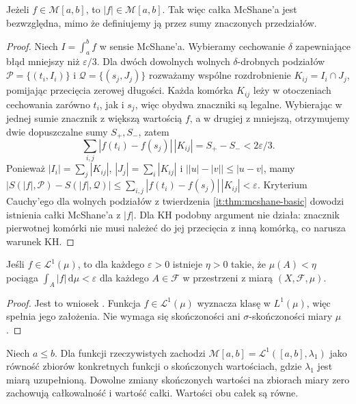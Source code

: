 \begin{twierdzenie}\label{it:thm:mcshane-absolute}
Jeżeli $f\in\mathcal M[a,b]$, to $|f|\in\mathcal M[a,b]$. Tak więc całka McShane'a jest bezwzględna, mimo że definiujemy ją przez sumy znaczonych przedziałów.
\end{twierdzenie}
\begin{proof}
Niech $I=\int_a^b f$ w sensie McShane'a. Wybieramy cechowanie $\delta$ zapewniające błąd mniejszy niż $\varepsilon/3$. Dla dwóch dowolnych wolnych $\delta$-drobnych podziałów $\mathcal P=\{(t_i,I_i)\}$ i $\mathcal Q=\{(s_j,J_j)\}$ rozważamy wspólne rozdrobnienie $K_{ij}=I_i\cap J_j$, pomijając przecięcia zerowej długości. Każda komórka $K_{ij}$ leży w otoczeniach cechowania zarówno $t_i$, jak i $s_j$, więc obydwa znaczniki są legalne. Wybierając w jednej sumie znacznik z większą wartością $f$, a w drugiej z mniejszą, otrzymujemy dwie dopuszczalne sumy $S_+,S_-$, zatem
\[
\sum_{i,j}|f(t_i)-f(s_j)|\,|K_{ij}|=S_+-S_-<2\varepsilon/3.
\]
Ponieważ $|I_i|=\sum_j|K_{ij}|$, $|J_j|=\sum_i|K_{ij}|$ i $\bigl||u|-|v|\bigr|\le|u-v|$, mamy
$|S(|f|,\mathcal P)-S(|f|,\mathcal Q)|\le\sum_{i,j}|f(t_i)-f(s_j)|\,|K_{ij}|<\varepsilon$.
Kryterium Cauchy'ego dla wolnych podziałów z twierdzenia \ref{it:thm:mcshane-basic} dowodzi istnienia całki McShane'a z $|f|$. Dla KH podobny argument nie działa: znacznik pierwotnej komórki nie musi należeć do jej przecięcia z inną komórką, co narusza warunek KH.
\end{proof}
\begin{lemat}\label{ma1:kh:lem:integral-ac}\label{it:lem:integral-absolute-continuity}
Jeśli $f\in\mathcal L^1(\mu)$, to dla każdego $\varepsilon>0$ istnieje $\eta>0$ takie, że $\mu(A)<\eta$ pociąga $\int_A|f|\,\mathrm d\mu<\varepsilon$ dla każdego $A\in\mathcal F$ w przestrzeni z miarą $(X,\mathcal F,\mu)$.
\end{lemat}
\begin{proof}
Jest to wniosek
.
Funkcja $f\in\mathcal L^1(\mu)$ wyznacza klasę w $L^1(\mu)$,
więc spełnia jego założenia. Nie wymaga się skończoności
ani $\sigma$-skończoności miary $\mu$.
\end{proof}
\begin{twierdzenie}[McShane = Lebesgue]\label{it:thm:mcshane-lebesgue}
Niech $a\le b$. Dla funkcji rzeczywistych zachodzi
$\mathcal M[a,b]=\mathcal L^1([a,b],\lambda_1)$
jako równość zbiorów konkretnych funkcji o skończonych
wartościach, gdzie $\lambda_1$ jest miarą uzupełnioną.
Dowolne zmiany skończonych wartości na zbiorach
miary zero zachowują całkowalność i wartość całki.
Wartości obu całek są równe.
\end{twierdzenie}

